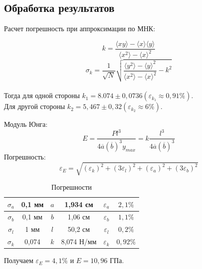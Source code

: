 \documentclass[a4paper]{article}
\begin{document}
\newpage
\subsection{Обработка результатов}

Расчет погрешность при аппроксимации по МНК:

\[k=\frac{\langle xy\rangle-\langle x\rangle \langle y\rangle}{\langle x^2\rangle - \langle x\rangle^2}\]
\[\sigma_{k} = \frac{1}{\sqrt{N}}\sqrt{\frac{\langle y^2 \rangle - \langle y \rangle ^2}{\langle x^2 \rangle - \langle x \rangle ^2} - k^2}\]\\
Тогда для одной стороны $k_{1} = 8.074 \pm 0,0736 (\varepsilon_{k_{1}} \approx 0,91\%)$.\\
Для другой стороны $k_{2} = 5,467 \pm 0,32 (\varepsilon_{k_{2}} \approx 6\%)$.

Модуль Юнга:
\begin{equation}
    E = \frac{Pl^3}{4\overline{a}(\overline{b})^3 y_{max}} = k\frac{l^3}{4\overline{a}(\overline{b})^3}
\end{equation}
Погрешность:
\[
    \varepsilon_{E} = \sqrt{(\varepsilon_{k})^2 + (3\varepsilon_{l})^2 + (\varepsilon_{a})^2 + (3\varepsilon_{b})^2}
\]
\begin{table}[h!]
\begin{center}
\begin{tabular}{|c|c|c|c|c|c|}
\hline
$\sigma_{a}$ & 0,1 мм & $a$ & 1,934 см   & $\varepsilon_{a}$ & $2,1\%$  \\ \hline
$\sigma_{b}$ & 0,1 мм & $b$ & 1,06 см    & $\varepsilon_{b}$ & $1,1\%$ \\ \hline
$\sigma_{l}$ & 1 мм   & $l$ & 50,2 см    & $\varepsilon_{l}$ & $0,2\%$  \\ \hline
$\sigma_{k}$ & 0,074  & $k$ & 8,074 Н/мм & $\varepsilon_{k}$ & $0,92\%$ \\ \hline
\end{tabular}
\caption{Погрешности}
\end{center}
\end{table}
Получаем $\varepsilon_{E} = 4,1\%$ и $E = 10,96$ ГПа. 
\end{document}
